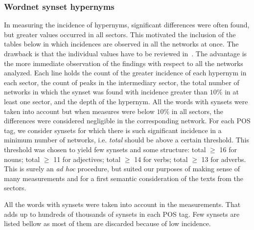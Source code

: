 \subsubsection{Wordnet synset hypernyms}\label{subsec:wn1}
In measuring the incidence of hypernyms, significant differences were often found, but greater values
occurred in all sectors.
This motivated the inclusion of the tables below in which incidences are observed in all the networks at once.
The drawback is that the individual values have to be reviewed in~\cite{textTables}.
The advantage is the more immediate observation of the findings with respect to all the networks analyzed.
Each line holds the count of the greater incidence of each hypernym in each sector,
the count of peaks in the intermediary sector, the total number of networks in which the
synset was found with incidence greater than $10\%$ in at least one sector,
and the depth of the hypernym.
All the words with synsets were taken into account but when measures were below $10\%$ in all
sectors, the differences were considered negligible in the corresponding network.
For each POS tag, we consider synsets for which there is such significant incidence in a minimum number of networks,
i.e. \emph{total} should be above a certain threshold.
This threshold was chosen to yield few synsets and some structure:
total $\geq$ 16 for nouns;
total $\geq$ 11 for adjectives;
total $\geq$ 14 for verbs;
total $\geq$ 13 for adverbs.
This is surely an \emph{ad hoc} procedure,
but suited our purposes of making sense of many measurements
and for a first semantic consideration of the texts from the sectors. 

All the words with synsets were taken into account in the measurements.
That adds up to hundreds of thousands of synsets in each POS tag.
Few synsets are listed bellow as most of them are discarded because of low incidence. 

